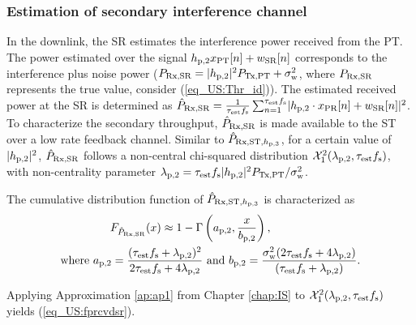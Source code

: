 \subsubsection{Estimation of secondary interference channel}
In the downlink, the SR estimates the interference power received from the PT. The power estimated over the signal $h_{\text{p,2}} x_{\text{PT}}[n] + w_{\text{SR}}[n]$ corresponds to the interference plus noise power ($P_{\text{Rx,SR}} = |h_{\text{p,2}}|^2 P_{\text{Tx,PT}} + \sigma^2_{\text{w}}$, where $P_{\text{Rx,SR}}$ represents the true value, consider (\ref{eq_US:Thr_id})). The estimated received power at the SR is determined as $\hat{P}_{\text{Rx,SR}} = {\frac{1}{{\tau_{\text{est}} f_{\text{s}}}}\sum_{n=1}^{\tau_{\text{est}} f_{\text{s}}}} {|h_{\text{p,2}} \cdot x_{\text{PR}}[n] + w_{\text{SR}}[n]|^2}$. To characterize the secondary throughput, $\hat{P}_{\text{Rx,SR}}$ is made available to the ST over a low rate feedback channel. Similar to $\hat{P}_{\text{Rx,ST,$h_{\text{p,3}}$}}$, for a certain value of $|h_{\text{p,2}}|^2$, $\hat{P}_{\text{Rx,SR}}$ follows a non-central chi-squared distribution $\ncchi2(\lpt, \test \fsam)$, with non-centrality parameter $\lambda_{\text{p,2}} = \tau_{\text{est}} f_{\text{s}} |h_{\text{p,2}}|^2 P_{\text{Tx,PT}} / \sigma^2_{\text{w}}$.
\begin{lemma} \label{lm_US:lm3}
\normalfont
The cumulative distribution function of $\hat{P}_{\text{Rx,ST,$h_{\text{p,3}}$}}$ is characterized as 
\begin{align}
F_{\hat{P}_{\text{Rx,SR}}}(x) \approx 1 - \Gamma&\left(a_{\text{p,2}}, \frac{x}{b_{\text{p,2}}}\right) \label{eq_US:fprcvdsr}, \\ 
\text{where  } a_{\text{p,2}} = \frac{(\tau_{\text{est}} f_{\text{s}} + \lambda_{\text{p,2}})^2}{2 \tau_{\text{est}} f_{\text{s}} + 4 \lambda_{\text{p,2}}} &\text{ and } b_{\text{p,2}} = \frac{\sigma^2_{\text{w}} (2 \tau_{\text{est}} f_{\text{s}} + 4 \lambda_{\text{p,2}})}{(\tau_{\text{est}} f_{\text{s}} + \lambda_{\text{p,2}})}.  \label{eq_US:para_pt} 
\end{align} 
\end{lemma}
\begin{IEEEproof}
Applying Approximation \ref{ap:ap1} from Chapter \ref{chap:IS} to $\ncchi2(\lpt, \test \fsam)$ yields (\ref{eq_US:fprcvdsr}). 
\end{IEEEproof}

